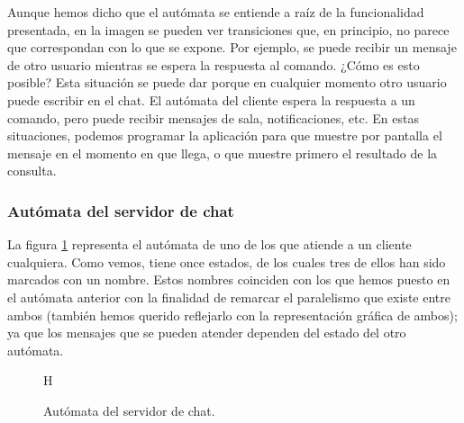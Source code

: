Aunque hemos dicho que el autómata se entiende a raíz de la funcionalidad presentada, en la imagen se pueden ver transiciones que, en principio, no parece que correspondan con lo que se expone. Por ejemplo, se puede recibir un mensaje de otro usuario mientras se espera la respuesta al comando. ¿Cómo es esto posible? Esta situación se puede dar porque en cualquier momento otro usuario puede escribir en el chat. El autómata del cliente espera la respuesta a un comando, pero puede recibir mensajes de sala, notificaciones, etc. En estas situaciones, podemos programar la aplicación para que muestre por pantalla el mensaje en el momento en que llega, o que muestre primero el resultado de la consulta.


\subsubsection{Autómata del servidor de chat}
La figura \ref{aut_servidor} representa el autómata de uno de los  que atiende a un cliente cualquiera. Como vemos, tiene once estados, de los cuales tres de ellos han sido marcados con un nombre. Estos nombres coinciden con los que hemos puesto en el autómata anterior con la finalidad de remarcar el paralelismo que existe entre ambos (también hemos querido reflejarlo con la representación gráfica de ambos); ya que los mensajes que se pueden atender dependen del estado del otro autómata.

\begin{figure}{H}
    \caption{Autómata del servidor de chat.}
    \label{aut_servidor}
\end{figure}

